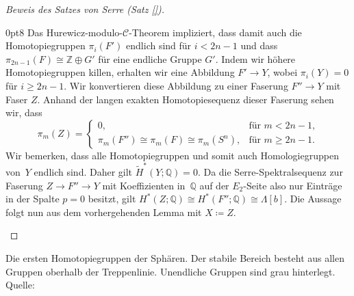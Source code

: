 \documentclass[11pt, a4paper, german]{article}
\theoremstyle{definition}
\theoremstyle{remark}
\newcommand{\Z}{\mathbb{Z}} %
\newcommand{\Q}{\mathbb{Q}} %
\newcommand{\SC}{\mathcal{C}} %
\begin{document}
\begin{proof}[Beweis des Satzes von Serre (Satz \ref{})]
\begin{cutout}{0}{\dimexpr\linewidth-5cm\relax}{0pt}{8}
    Das Hurewicz-modulo-$\SC$-Theorem impliziert, dass damit auch die Homotopiegruppen $\pi_i(F')$ endlich sind für $i < 2n-1$ und dass $\pi_{2n-1}(F) \cong \Z \oplus G'$ für eine endliche Gruppe $G'$.
    Indem wir höhere Homotopiegruppen killen, erhalten wir eine Abbildung $F' \to Y$, wobei $\pi_i(Y) = 0$ für $i \geq 2n-1$.
    Wir konvertieren diese Abbildung zu einer Faserung $F'' \to Y$ mit Faser $Z$.
    Anhand der langen exakten Homotopiesequenz dieser Faserung sehen wir, dass
    \[
      \pi_m(Z) = \begin{cases}
        0, & \text{für $m < 2n-1$,} \\
        \pi_m(F'') \cong \pi_m(F) \cong \pi_m(S^n), & \text{für $m \geq 2n-1$.}
      \end{cases}
    \]
    Wir bemerken, dass alle Homotopiegruppen und somit auch Homologiegruppen von~$Y$ endlich sind.
    Daher gilt $\widetilde{H}^*(Y; \Q) = 0$.
    Da die Serre-Spektralsequenz zur Faserung $Z \to F'' \to Y$ mit Koeffizienten in~$\Q$ auf der $E_2$-Seite also nur Einträge in der Spalte $p=0$ besitzt, gilt $H^*(Z; \Q) \cong H^*(F''; \Q) \cong \Lambda[b]$.
    Die Aussage folgt nun aus dem vorhergehenden Lemma mit $X \coloneqq Z$.
  \end{cutout}
\end{proof}

\nocite{*}
\printbibliography

\newpage
{}
\begin{landscape}
  \begin{center}
    \mbox{}\vspace{8em}
    \begin{table}
      \footnotesize \setlength\extrarowheight{5pt}
      
      \caption{Die ersten Homotopiegruppen der Sphären. Der stabile Bereich besteht aus allen Gruppen oberhalb der Treppenlinie. Unendliche Gruppen sind grau hinterlegt. Quelle: \cite{toda:composition-methods}}
    \end{table}
  \end{center}
\end{landscape}

\end{document}
